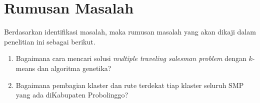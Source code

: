 \section{Rumusan Masalah}

Berdasarkan identifikasi masalah, maka rumusan masalah yang akan dikaji dalam penelitian ini sebagai berikut.
\begin{enumerate}
    \item Bagaimana cara mencari solusi \textit{multiple traveling salesman problem} dengan $k$-means dan algoritma genetika?
    \item Bagaimana pembagian klaster dan rute terdekat tiap klaster seluruh SMP yang ada diKabupaten Probolinggo?
\end{enumerate}